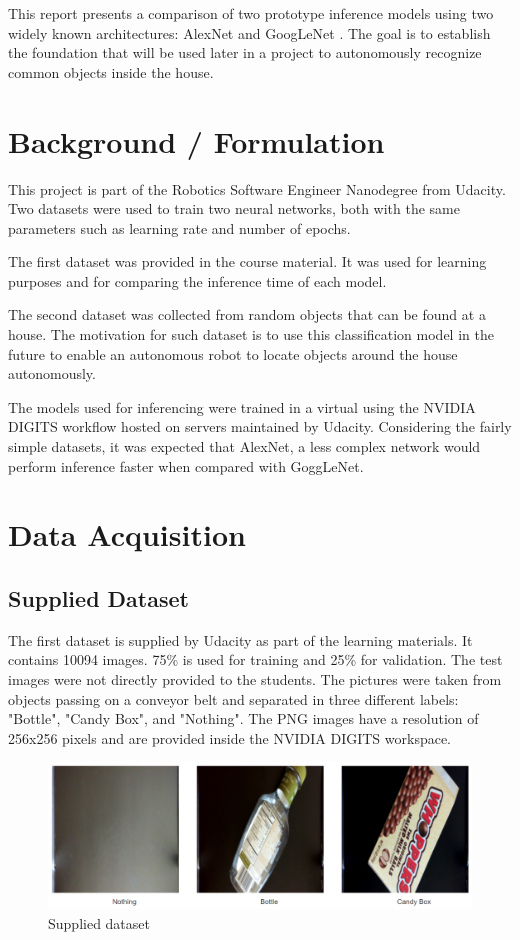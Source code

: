 \documentclass[10pt,journal,compsoc]{IEEEtran}
\begin{document}
This report presents a comparison of two prototype inference models using two widely known architectures: AlexNet \cite{NIPS2012_4824} and GoogLeNet \cite{GLN43022}. The goal is to establish the foundation that will be used later in a project to autonomously recognize common objects inside the house. 

\section{Background / Formulation}

This project is part of the Robotics Software Engineer Nanodegree from Udacity. 
Two datasets were used to train two neural networks, both with the same parameters such as learning rate and number of epochs. 

The first dataset was provided in the course material. It was used for learning purposes and for comparing the inference time of each model. 

The second dataset was collected from random objects that can be found at a house. The motivation for such dataset is to use this classification model in the future to enable an autonomous robot to locate objects around the house autonomously. 

The models used for inferencing were trained in a virtual using the NVIDIA DIGITS workflow hosted on servers maintained by Udacity. 
Considering the fairly simple datasets, it was expected that AlexNet, a less complex network would perform inference faster when compared with GoggLeNet. 
\section{Data Acquisition}

\subsection{Supplied Dataset}
The first dataset is supplied by Udacity as part of the learning materials. It contains 10094 images. 75\% is used for training and 25\% for validation. The test images were not directly provided to the students. The pictures were taken from objects passing on a conveyor belt and separated in three different labels: "Bottle", "Candy Box", and "Nothing". The PNG images have a resolution of 256x256 pixels and are provided inside the NVIDIA DIGITS workspace.
\begin{figure}[thpb]
      \centering
      \includegraphics[width=\linewidth]{p_dataset.png}
      \caption{Supplied dataset}
      \label{fig:supplied_dataset}
\end{figure}
\end{document}

